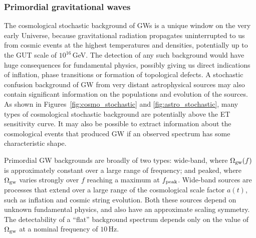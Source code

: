 \subsubsection{Primordial gravitational waves}
\label{cosmo_stochastic}

The cosmological stochastic background of GWs \cite{Allen1997} is a unique window on the very early Universe, because gravitational radiation propagates uninterrupted to us from cosmic events at the highest temperatures and densities, potentially up to the GUT scale of $10^{16}\,$GeV. The detection of any such background would have huge consequences for fundamental physics, possibly giving us direct indications of inflation, phase transitions or formation of topological defects. A stochastic confusion background of GW from very distant astrophysical sources may also contain significant information on the populations and evolution of the sources.  As shown in Figures~\ref{fig:cosmo_stochastic} and \ref{fig:astro_stochastic}, many types of cosmological stochastic background are potentially above the ET sensitivity curve. It may also be possible to extract information about the cosmological events that produced GW if an observed spectrum has some characteristic shape.

Primordial GW backgrounds are broadly of two types: wide-band, where $\Omega_{\rm gw}(f)$ is approximately constant over a large range of frequency; and peaked, where $\Omega_{\rm gw}$ varies strongly over $f$ reaching a maximum at $f_{\rm peak}$. Wide-band sources are processes that extend over a large range of the cosmological scale factor $a(t)$, such as inflation and cosmic string evolution. Both these sources depend on unknown fundamental physics, and also have an approximate scaling symmetry. The detectability of a ``flat'' background spectrum depends only on the value of $\Omega_{\rm gw}$ at a nominal frequency of $10\,$Hz.

